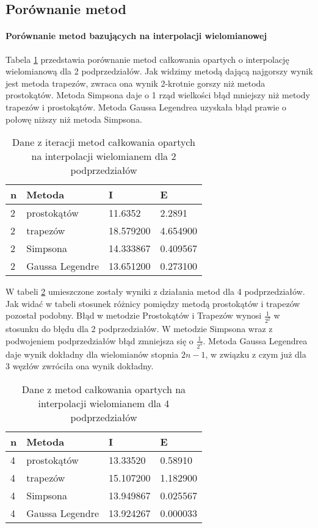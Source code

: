 \documentclass[12pt,twoside]{article}
\begin{document}
\clearpage

\subsection{Porównanie metod}

\paragraph{Porównanie metod bazujących na interpolacji wielomianowej}\mbox{}

Tabela \ref{tabela9.1} przedstawia porównanie metod całkowania opartych o interpolację wielomianową dla 2 podprzedziałów.
Jak widzimy metodą dającą najgorszy wynik jest metoda trapezów, zwraca ona wynik 2-krotnie gorszy niż metoda prostokątów. 
Metoda Simpsona daje o 1 rząd wielkości błąd mniejszy niż metody trapezów i prostokątów. 
Metoda Gaussa Legendrea uzyskała błąd prawie o połowę niższy niż metoda Simpsona.

\begin{table}[h]
\centering 
\caption{Dane z iteracji metod całkowania opartych na interpolacji wielomianem dla 2 podprzedziałów }
\label{tabela9.1}
\begin{tabular}{llll}
\toprule
{n} & Metoda &  I &  E \\
\midrule
2  &     prostokątów & 11.6352 &   2.2891  \\
2  &     trapezów & 18.579200 &  4.654900  \\
2  &     Simpsona & 14.333867 &   0.409567  \\
2  &     Gaussa Legendre & 13.651200 &  0.273100  \\
\bottomrule
\end{tabular}
\end{table}


W tabeli \ref{tabela9.2} umieszczone zostały wyniki z działania metod dla 4 podprzedziałów.
Jak widać w tabeli stosunek różnicy pomiędzy metodą prostokątów i trapezów pozostał podobny.
Błąd w metodzie Prostokątów i Trapezów wynosi $\frac{1}{2^2}$ w stosunku do błędu dla 2 podprzedziałów.
W metodzie Simpsona wraz z podwojeniem podprzedziałów błąd zmniejsza się o $\frac{1}{2^4}$.
Metoda Gaussa Legendrea daje wynik dokładny dla wielomianów stopnia $2n-1$, w związku z czym już dla 3 węzłów zwróciła ona wynik dokładny.


\begin{table}[h]
\centering 
\caption{Dane z metod całkowania opartych na interpolacji wielomianem dla 4 podprzedziałów }\mbox{}
\label{tabela9.2}
\begin{tabular}{llll}
\toprule
{n} & Metoda &  I &  E \\
\midrule
4  &     prostokątów & 13.33520 &   0.58910  \\
4  &     trapezów & 15.107200 &  1.182900  \\
4  &     Simpsona & 13.949867 &   0.025567  \\
4  &     Gaussa Legendre & 13.924267 &  0.000033  \\
\bottomrule
\end{tabular}
\end{table}
\end{document}
